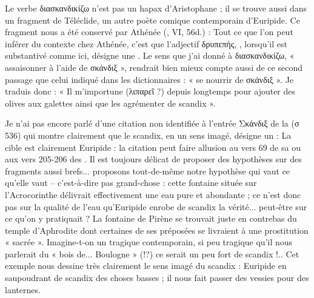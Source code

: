 {Le verbe διασκανδικίζω n'est pas un hapax d'Aristophane ; il se trouve aussi dans un fragment de Téléclide, un autre poète comique contemporain d'Euripide. Ce fragment nous a été conservé par Athénée (, VI, 56d.) :
Tout ce que l'on peut inférer du contexte chez Athénée, c'est que l'adjectif δρυπεπής, , lorsqu'il est substantivé comme ici, désigne une . 
Le sens que j'ai donné à διασκανδικίζω, « assaisonner à l'aide de σκάνδιξ », rendrait bien mieux compte aussi de ce second passage que celui indiqué dans les dictionnaires : « se nourrir de σκάνδιξ ».
Je traduis donc : « Il m'importune (λιπαρεῖ ?) depuis longtemps pour ajouter des olives aux galettes ainsi que les agrémenter de scandix ».

Je n'ai pas encore parlé d'une citation non identifiée à l'entrée Σκάνδιξ de la  (σ 536) qui montre clairement que le scandix, en un sens imagé, désigne un  :
La cible est clairement Euripide : la citation peut faire allusion au vers 69 de sa  ou aux vers 205-206 des . Il est toujours délicat de proposer des hypothèses sur des fragments aussi brefs... proposons tout-de-même notre hypothèse qui vaut ce qu'elle vaut – c'est-à-dire pas grand-chose : cette fontaine située sur l'Acrocorinthe délivrait effectivement une eau pure et abondante ; ce n'est donc pas sur la qualité de l'eau qu'Euripide enrobe de scandix la vérité... peut-être sur ce qu'on y pratiquait ? La fontaine de Pirène se trouvait juste en contrebas du temple d'Aphrodite dont certaines de ses préposées se livraient à une prostitution « sacrée ». Imagine-t-on un tragique contemporain, si peu tragique qu'il nous parlerait du «  bois de... Boulogne » (!?) ce serait un peu fort de scandix !.. Cet exemple nous dessine très clairement le sens imagé du scandix : Euripide  en saupoudrant de scandix des choses basses ; il nous fait passer des vessies pour des lanternes.

}
